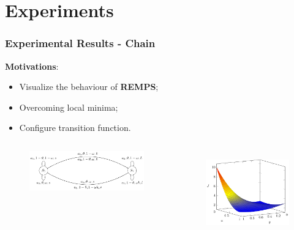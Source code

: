 \documentclass[english,aspectratio=1610]{beamer}
\theoremstyle{mystyle}
\theoremstyle{mystyle}
\theoremstyle{mystyle}
\begin{document}
\section{Experiments}
\begin{frame}
	\frametitle{Experimental Results - Chain}
	\textbf{Motivations}: \begin{itemize}
 \item Visualize the behaviour of \textbf{REMPS};
 \item Overcoming local minima;
 \item Configure transition function.
 \end{itemize}
 \vspace{-2.3cm}
	\begin{columns}[T]
	\centering
	\vspace{2cm}
	\begin{figure}
		\includegraphics[width=1.2\textwidth]{pictures/chain}
	\end{figure}
	\centering
	\begin{figure}
		\includegraphics[height=0.42\textheight]{plots/chain/plot_chain_surface} \\

\end{figure}
\end{columns}
\end{frame}
\end{document}

